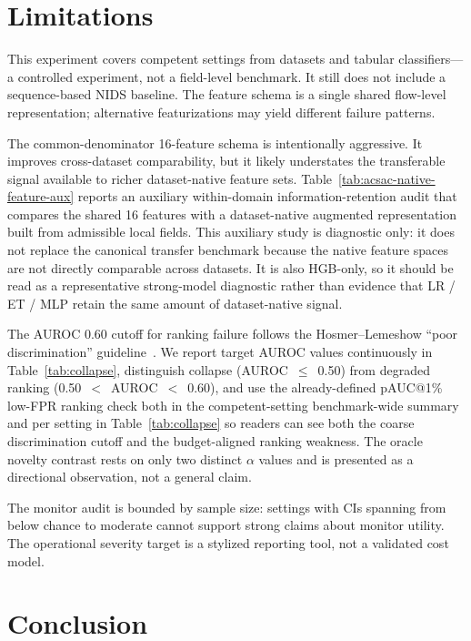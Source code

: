 \documentclass[10pt,conference]{IEEEtran}
\begin{document}
\section{Limitations}

This experiment covers \CompetentSettingCount{} competent settings from \DatasetCount{} datasets and \ModelCount{} tabular classifiers---a controlled experiment, not a field-level benchmark. It still does not include a sequence-based NIDS baseline. The feature schema is a single shared flow-level representation; alternative featurizations may yield different failure patterns.

The common-denominator 16-feature schema is intentionally aggressive. It improves cross-dataset comparability, but it likely understates the transferable signal available to richer dataset-native feature sets. Table~\ref{tab:acsac-native-feature-aux} reports an auxiliary within-domain information-retention audit that compares the shared 16 features with a dataset-native augmented representation built from admissible local fields. This auxiliary study is diagnostic only: it does not replace the canonical transfer benchmark because the native feature spaces are not directly comparable across datasets. It is also HGB-only, so it should be read as a representative strong-model diagnostic rather than evidence that LR / ET / MLP retain the same amount of dataset-native signal.



The AUROC 0.60 cutoff for ranking failure follows the Hosmer--Lemeshow ``poor discrimination'' guideline~\cite{hosmer2013applied}. We report target AUROC values continuously in Table~\ref{tab:collapse}, distinguish collapse (AUROC~$\leq$~0.50) from degraded ranking (0.50~$<$~AUROC~$<$~0.60), and use the already-defined pAUC@1\% low-FPR ranking check both in the competent-setting benchmark-wide summary and per setting in Table~\ref{tab:collapse} so readers can see both the coarse discrimination cutoff and the budget-aligned ranking weakness. The oracle novelty contrast rests on only two distinct $\alpha$ values and is presented as a directional observation, not a general claim.

The monitor audit is bounded by sample size: \NaturalSettingCount{} settings with CIs spanning from below chance to moderate cannot support strong claims about monitor utility. The operational severity target is a stylized reporting tool, not a validated cost model.

\section{Conclusion}
\end{document}
